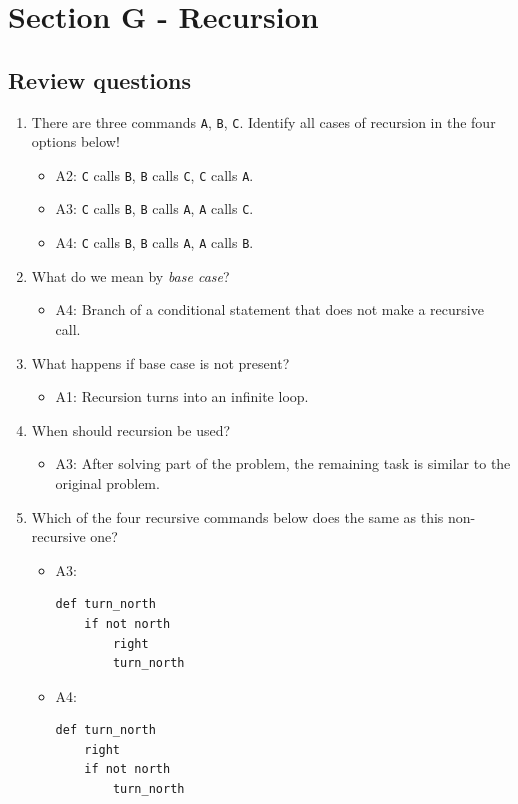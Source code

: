 \documentclass[article,A4,12pt]{llncs}
\begin{document}
\section{Section G - Recursion}

\subsection{Review questions}

\begin{enumerate}
\item There are three commands {\tt A}, {\tt B}, {\tt C}. Identify all cases of recursion in the four options below!
  \begin{itemize}
    \item A2: {\tt C} calls {\tt B}, {\tt B} calls {\tt C}, {\tt C} calls {\tt A}.
    \item A3: {\tt C} calls {\tt B}, {\tt B} calls {\tt A}, {\tt A} calls {\tt C}.
    \item A4: {\tt C} calls {\tt B}, {\tt B} calls {\tt A}, {\tt A} calls {\tt B}.
  \end{itemize}
\item What do we mean by {\em base case}?
  \begin{itemize}
    \item A4: Branch of a conditional statement that does not make a recursive call.
  \end{itemize}
\item What happens if base case is not present?
  \begin{itemize}
    \item A1: Recursion turns into an infinite loop.
  \end{itemize}
\item When should recursion be used?
  \begin{itemize}
    \item A3: After solving part of the problem, the remaining task is similar to the original problem.
  \end{itemize}
\item Which of the four recursive commands below does the same as this non-recursive one?
  \begin{itemize}
    \item A3:
\begin{verbatim}
def turn_north
    if not north
        right
        turn_north
\end{verbatim}
    \item A4:
\begin{verbatim}
def turn_north
    right
    if not north 
        turn_north
\end{verbatim}
  \end{itemize}
\end{enumerate}
\end{document}
